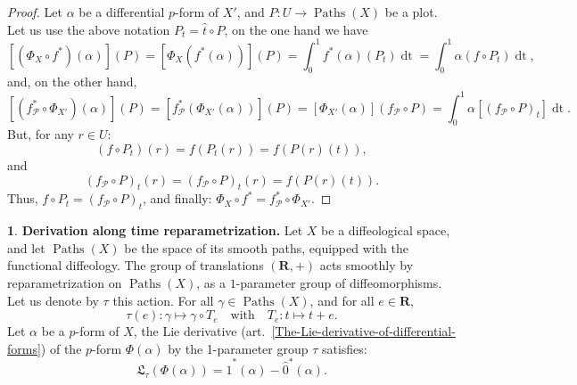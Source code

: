 \documentclass[11pt,reqno]{amsart}
\theoremstyle{definition}
\newtheorem{article}{}
\newcommand{\artlabel}[1]{{\bf #1.}}
\newcommand{\RR}{{\mathbf R}}
\def \P{{P}}
\def \T{{T}}
\def \U{{U}}
\def \X{{X}}
\newcommand{\cP}{{\mathcal P}}
\newcommand{\fL}{{\mathfrak  L}}
\newcommand{\art}[1]{{(art.~\ref{#1})}}
\newcommand{\Paths}{\operatorname{Paths}}
\newcommand{\source}{\hat 0}
\newcommand{\but}{\hat 1}
\newcommand{\DLie}{{\fL}}
\newcommand{\dt}{\operatorname{dt}}
\def \fPaths#1{#1_{\cP}}
\begin{document}
  \begin{proof}
    Let $\alpha$ be a differential $p$-form of $\X'$, and
    $\P: \U \to \Paths(\X)$ be a plot. Let us use the above notation $\P_t =
      {\hat t} \circ \P$, on the one hand we have
    $$
      [(\Phi_\X \circ f^*)(\alpha)](\P) = 
      [\Phi_\X(f^*(\alpha))](\P) =  \int_0^1
      f^*(\alpha)(\P_t) \dt =  \int_0^1 \alpha(f \circ \P_t)
      \dt,
      $$
    and, on the other hand,
    $$
      [(\fPaths{f}^* \circ \Phi_{\X'})(\alpha)](\P) = 
      [\fPaths{f}^*(\Phi_{\X'}(\alpha))](\P) = [\Phi_{\X'}(\alpha)](\fPaths{f} \circ \P) = 
      \int_0^1 \alpha[(\fPaths{f} \circ \P)_t] \dt.
      $$
    But, for any $r \in \U$: 
    $$
      (f \circ \P_t)(r) = f(\P_t(r)) = f(\P(r)(t)),
      $$
    and 
    $$
      (\fPaths{f} \circ \P)_t(r) = (\fPaths{f} \circ
      \P)_t(r) = f(\P(r)(t)).
      $$
    Thus, $f \circ \P_t = (\fPaths{f} \circ \P)_t$, and
    finally:  $\Phi_\X \circ f^* = \fPaths{f}^* \circ
      \Phi_{\X'}$.  \end{proof}
  
  \begin{article}\artlabel{Derivation along time reparametrization}
    \label{Derivation-along-time-reparametrization}
    Let $\X$ be a diffeological space, and let $\Paths(\X)$
    be the space of its smooth paths, equipped with the
    functional diffeology. The group of translations
    $(\RR,+)$ acts smoothly by reparametrization on $\Paths(\X)$, as a
    $1$-parameter group of diffeomorphisms. Let us denote
    by $\tau$ this action. For all $\gamma \in \Paths(\X)$,
    and for  all $e \in \RR$,
    $$ 
      \tau(e): \gamma \mapsto \gamma \circ {\T}_e \quad \mbox{with}
      \quad {\T}_e: t \mapsto t+e.
      $$ 
    Let $\alpha$ be a $p$-form of $\X$, the Lie derivative
    \art{The-Lie-derivative-of-differential-forms} of the
    $p$-form $\Phi(\alpha)$ by the 1-parameter group $\tau$
    satisfies: 
    $$ 
      \DLie_\tau (\Phi(\alpha)) = \but^*(\alpha) -\source^*(\alpha).
      $$ 
  \end{article} %
  
\end{document}

